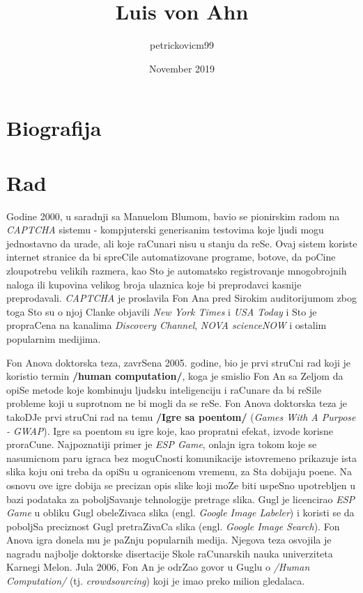 \documentclass{article}
\title{Luis von Ahn}
\author{petrickovicm99 }
\date{November 2019}
\begin{document}
\maketitle

\section{Biografija}

\section{Rad}
Godine 2000, u saradnji sa Manuelom Blumom, bavio se pionirskim radom na \textit{CAPTCHA} sistemu - kompjuterski generisanim testovima koje ljudi mogu jednostavno da urade, ali koje raCunari nisu u stanju da reSe. Ovaj sistem koriste internet stranice da bi spreCile automatizovane programe, botove, da poCine zloupotrebu velikih razmera, kao Sto je automatsko registrovanje mnogobrojnih naloga ili kupovina velikog broja ulaznica koje bi preprodavci kasnije preprodavali. \textit{CAPTCHA} je proslavila Fon Ana pred Sirokim auditorijumom zbog toga Sto su o njoj Clanke objavili \textit{New York Times} i \textit{USA Today} i Sto je propraCena na kanalima \textit{Discovery Channel}, \textit{NOVA scienceNOW} i ostalim popularnim medijima.

Fon Anova doktorska teza, zavrSena 2005. godine, bio je prvi struCni rad koji je koristio termin \textbf{/human computation/}, koga je smislio Fon An sa Zeljom da opiSe metode koje kombinuju ljudsku inteligenciju i raCunare da bi reSile probleme koji u suprotnom ne bi mogli da se reSe. Fon Anova doktorska teza je takoDJe prvi struCni rad na temu \textbf{/Igre sa poentom/} (\textit{Games With A Purpose - GWAP}). Igre sa poentom su igre koje, kao propratni efekat, izvode korisne proraCune. Najpoznatiji primer je \textit{ESP Game}, onlajn igra tokom koje se nasumicnom paru igraca bez moguCnosti komunikacije istovremeno prikazuje ista slika koju oni treba da opiSu u ogranicenom vremenu, za Sta dobijaju poene. Na osnovu ove igre dobija se precizan opis slike koji moZe biti uspeSno upotrebljen u bazi podataka za poboljSavanje tehnologije pretrage slika. Gugl je licencirao \textit{ESP Game} u obliku Gugl obeleZivaca slika (engl. \textit{Google Image Labeler}) i koristi se da poboljSa preciznost Gugl pretraZivaCa slika (engl. \textit{Google Image Search}). Fon Anova igra donela mu je paZnju popularnih medija. Njegova teza osvojila je nagradu najbolje doktorske disertacije Skole raCunarskih nauka univerziteta Karnegi Melon. Jula 2006, Fon An je odrZao govor u Guglu o \textit{/Human Computation/} (tj. \textit{crowdsourcing}) koji je imao preko milion gledalaca.
\end{document}
